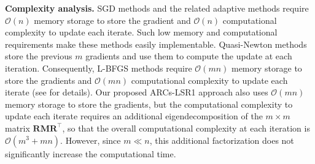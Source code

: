 \noindent \textbf{Complexity analysis.} 
SGD methods and the related adaptive methods require $\mathcal{O}(n)$ memory storage to store
the gradient and $\mathcal{O}(n)$ computational complexity to update each iterate.
Such low memory and computational requirements make these methods easily implementable.  
Quasi-Newton methods store the previous $m$ gradients and use them to compute the update at each iteration.  Consequently,  L-BFGS methods require $\mathcal{O}(mn)$ memory storage to store
the gradients and $\mathcal{O}(mn)$ computational complexity to update each iterate 
(see \citet{Burdakov2017} for details).  Our proposed ARCs-LSR1 approach also uses 
$\mathcal{O}(mn)$ memory storage to store the gradients, but the computational 
complexity to update each iterate requires an additional eigendecomposition of the $m \times m$
matrix $\mathbf{RMR}^{\top}$, so that the overall computational complexity at each iteration is
$\mathcal{O}(m^3+ mn)$.  However, since $m \ll n$, this additional factorization does not significantly
increase the computational time.%

